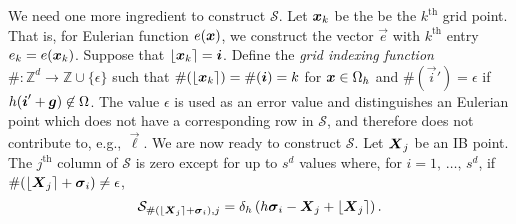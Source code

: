 We need one more ingredient to construct $\mathcal{S}$. Let $\boldsymbol{x}_k$ be the be
the $k^\text{th}$ grid point. That is, for Eulerian function $e(\boldsymbol{x})$, we
construct the vector $\vec{e}$ with $k^\text{th}$ entry $e_k = e(\boldsymbol{x}_k)$.
Suppose that $\left\lfloor{\boldsymbol{x}_k}\right\rceil=\boldsymbol{i}$. Define the \emph{grid indexing function}
$\#:\mathbb{Z}^d\to\mathbb{Z}\cup\{\epsilon\}$ such that $\#(\left\lfloor{\boldsymbol{x}_k}\right\rceil) =
\#(\boldsymbol{i}) = k$ for $\boldsymbol{x}\in\Omega_h$ and $\#(\vec{i}') = \epsilon$ if
$h(\boldsymbol{i}'+\boldsymbol{g}) \not\in \Omega$. The value $\epsilon$ is used as an error
value and distinguishes an Eulerian point which does not have a corresponding
row in $\mathcal{S}$, and therefore does not contribute to, e.g., $\vec{\ell}$.
We are now ready to construct $\mathcal{S}$. Let $\boldsymbol{X}_j$ be an IB point. The
$j^\text{th}$ column of $\mathcal{S}$ is zero except for up to $s^d$ values
where, for $i=1,\,\ldots,\,s^d$, if $\#(\left\lfloor{\boldsymbol{X}_j}\right\rceil+\boldsymbol{\sigma}_i)\neq\epsilon$,
\begin{equation}
    \label{eq:s-columnwise}
    \mathcal{S}_{\#\left(\left\lfloor{\boldsymbol{X}_j}\right\rceil + \boldsymbol{\sigma}_i\right),j} = \delta_h\left(h\boldsymbol{\sigma}_i-\boldsymbol{X}_j+\left\lfloor{\boldsymbol{X}_j}\right\rceil\right).
\end{equation}

